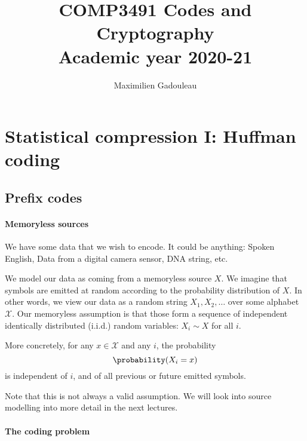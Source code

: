 \documentclass[a4paper, 11pt, openany]{book}
\title{COMP3491 Codes and Cryptography\\ Academic year 2020-21}
\date{\Important{Version \today}}
\author{Maximilien Gadouleau}
\begin{document}
\maketitle

\tableofcontents










\appendix

\section{Statistical compression I: Huffman coding}
\label{sec:01}

\subsection{Prefix codes}

\paragraph{Memoryless sources}

We have some data that we wish to encode. It could be anything: Spoken English, Data from a digital camera sensor, DNA string, etc.

We model our data as coming from a memoryless source $X$. We imagine that symbols are emitted at random according to the probability distribution of $X$. In other words, we view our data as a random string $X_1, X_2, \dots$ over some alphabet $\mathcal{X}$. Our memoryless assumption is that those form a sequence of independent identically distributed (i.i.d.) random variables: $X_i \sim X$ for all $i$.

More concretely, for any $x \in \mathcal{X}$ and any $i$, the probability
\[
    \probability(X_i = x)
\]
is independent of $i$, and of all previous or future emitted symbols.

Note that this is not always a valid assumption. We will look into source modelling into more detail in the next lectures.



\paragraph{The coding problem}
\end{document}
